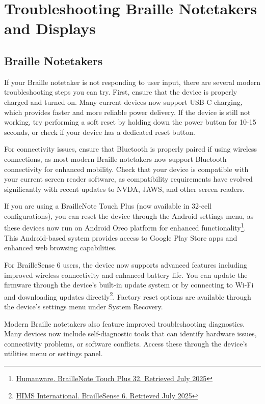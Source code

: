 \chapter{Troubleshooting Braille Notetakers and Displays}\label{trouble2}

\section{Braille Notetakers}\label{notebook}
If your Braille notetaker is not responding to user input, there are several modern troubleshooting steps you can try. First, ensure that the device is properly charged and turned on. Many current devices now support USB-C charging, which provides faster and more reliable power delivery. If the device is still not working, try performing a soft reset by holding down the power button for 10-15 seconds, or check if your device has a dedicated reset button.

For connectivity issues, ensure that Bluetooth is properly paired if using wireless connections, as most modern Braille notetakers now support Bluetooth connectivity for enhanced mobility. Check that your device is compatible with your current screen reader software, as compatibility requirements have evolved significantly with recent updates to NVDA, JAWS, and other screen readers.

If you are using a BrailleNote Touch Plus (now available in 32-cell configurations), you can reset the device through the Android settings menu, as these devices now run on Android Oreo platform for enhanced functionality\footnote{\raggedright \href{https://store.humanware.com/hus/blindness-braillenote-touch-plus-32.html}{Humanware. BrailleNote Touch Plus 32. Retrieved July 2025}}. This Android-based system provides access to Google Play Store apps and enhanced web browsing capabilities.

For BrailleSense 6 users, the device now supports advanced features including improved wireless connectivity and enhanced battery life. You can update the firmware through the device's built-in update system or by connecting to Wi-Fi and downloading updates directly\footnote{\raggedright \href{https://himsintl.com/en/blindness/view.php?idx=8}{HIMS International. BrailleSense 6. Retrieved July 2025}}. Factory reset options are available through the device's settings menu under System Recovery.

Modern Braille notetakers also feature improved troubleshooting diagnostics. Many devices now include self-diagnostic tools that can identify hardware issues, connectivity problems, or software conflicts. Access these through the device's utilities menu or settings panel.

